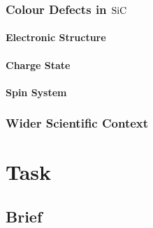 \cite{Ohshima2018}

\cite{Mu2020}


\cite{Wang2019}


\cite{Sardi2020}

\subsection{Colour Defects in $\ce{SiC}$}
\subsubsection{Electronic Structure}
\subsubsection{Charge State}
\subsubsection{Spin System}


\subsection{Wider Scientific Context}
\cite{Kraus2013}




\chapter{Task}
\section{Brief}


